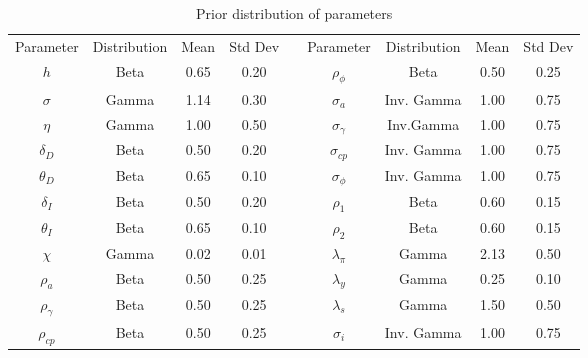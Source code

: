 \documentclass[12pt,a4paper]{article}
\begin{document}
\begin{table}[!h]
	\centering
	\caption{Prior distribution of parameters}
	\label{tab:prioris}
	\footnotesize
	\begin{tabular}{ccccccccc}
		\hline
		Parameter & Distribution & Mean & Std Dev & & Parameter & Distribution & Mean & Std Dev \\ \cline{1-4} \cline{6-9}
		$h$           & Beta & 0.65 & 0.20 & & $\rho_\phi$     & Beta      & 0.50 & 0.25 \\
		$\sigma$      & Gamma & 1.14 & 0.30 & & $\sigma_a$      & Inv. Gamma & 1.00 & 0.75 \\
		$\eta$        & Gamma & 1.00 & 0.50 & & $\sigma_\gamma$ & Inv.Gamma & 1.00 & 0.75 \\
		$\delta_D$    & Beta & 0.50 & 0.20 & & $\sigma_{cp}$   & Inv. Gamma & 1.00 & 0.75 \\
		$\theta_D$    & Beta & 0.65 & 0.10 & & $\sigma_\phi$   & Inv. Gamma & 1.00 & 0.75 \\
		$\delta_I$    & Beta & 0.50 & 0.20 & & $\rho_1$        & Beta      & 0.60 & 0.15 \\
		$\theta_I$    & Beta & 0.65 & 0.10 & & $\rho_2$        & Beta      & 0.60 & 0.15 \\
		$\chi$        & Gamma & 0.02 & 0.01 & & $\lambda_\pi$   & Gamma      & 2.13 & 0.50 \\
		$\rho_a$      & Beta & 0.50 & 0.25 & & $\lambda_y$     & Gamma      & 0.25 & 0.10 \\
		$\rho_\gamma$ & Beta & 0.50 & 0.25 & & $\lambda_s$     & Gamma      & 1.50 & 0.50 \\
		$\rho_{cp}$   & Beta & 0.50 & 0.25 & & $\sigma_i$      & Inv. Gamma  & 1.00 & 0.75 \\
		\hline
	\end{tabular}
\end{table}



\end{document}
